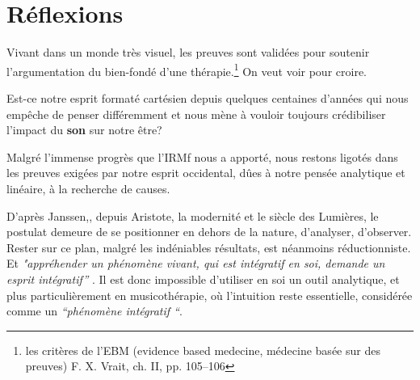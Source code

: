 \chapter{Réflexions}



 
 

  Vivant dans un monde très visuel, les preuves sont
validées pour soutenir l'argumentation du bien-fondé d'une thérapie.\footnote{
	les critères de l'EBM (evidence based medecine, médecine basée sur des 
        preuves) F. X. Vrait, ch. II, pp. 105--106 }
      On veut voir pour croire.

      Est-ce notre esprit formaté cartésien depuis quelques centaines d'années qui nous 
empêche de penser différemment 
et nous mène à vouloir toujours crédibiliser l'impact 
du \textbf{son} sur notre être?


Malgré l'immense progrès que l'IRMf nous a apporté, nous restons
  ligotés dans les preuves exigées par notre esprit occidental, dûes à
  notre pensée analytique et linéaire, à la recherche de
  causes.

  D'après Janssen,\autocite[201]{van_eersel_cerveau}, depuis Aristote, la modernité et le
siècle des Lumières, le postulat demeure de se positionner en dehors
de la nature, d'analyser, d'observer. Rester sur ce plan, malgré les
indéniables résultats, est néanmoins
réductionniste. Et 
\textit{"appréhender un phénomène vivant, qui est intégratif en soi, demande un esprit
intégratif''} \autocite[201]{van_eersel_cerveau}. Il est donc impossible d'utiliser en soi un outil analytique, et
plus 
particulièrement en musicothérapie, où l'intuition reste essentielle, 
considérée comme un \textit{``phénomène intégratif ``}.


